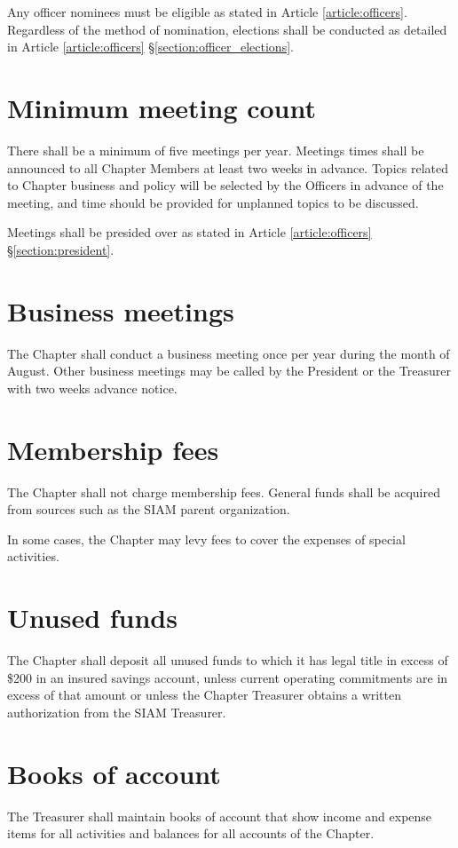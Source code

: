 \documentclass{ronr-bylaws}
\newcommand{\refsection}[2]{Article \ref{#1} \S \ref{#2}}
\newcommand{\refarticle}[1]{Article \ref{#1}}
\begin{document}
Any officer nominees must be eligible as stated in \refarticle{article:officers}. Regardless of the
method of nomination, elections shall be conducted as detailed in
\refsection{article:officers}{section:officer_elections}.

\section{Minimum meeting count}
There shall be a minimum of five meetings per year. Meetings times shall be announced to all Chapter
Members at least two weeks in advance. Topics related to Chapter business and policy will be
selected by the Officers in advance of the meeting, and time should be provided for unplanned topics
to be discussed.

Meetings shall be presided over as stated in \refsection{article:officers}{section:president}.

\section{Business meetings}
The Chapter shall conduct a business meeting once per year during the month of August. Other
business meetings may be called by the President or the Treasurer with two weeks advance notice.

\section{Membership fees}
The Chapter shall not charge membership fees. General funds shall be acquired from sources such as
the SIAM parent organization.

In some cases, the Chapter may levy fees to cover the expenses of special activities.

\section{Unused funds}
The Chapter shall deposit all unused funds to which it has legal title in excess of \$200 in an
insured savings account, unless current operating commitments are in excess of that amount or unless
the Chapter Treasurer obtains a written authorization from the SIAM Treasurer.

\section{Books of account}
The Treasurer shall maintain books of account that show income and expense items for all activities
and balances for all accounts of the Chapter.
\end{document}
